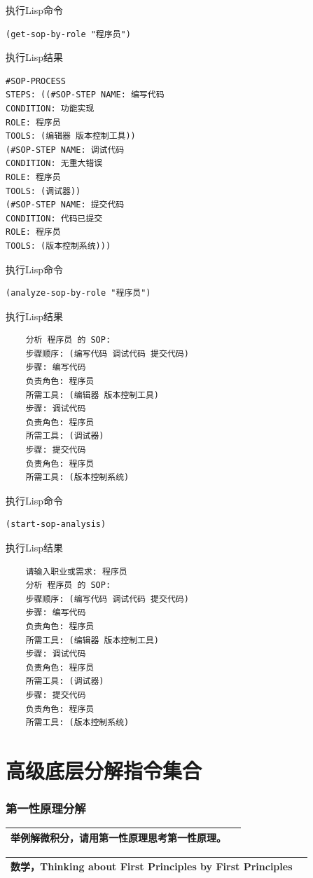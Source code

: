 \documentclass[12pt]{book}
\begin{document}
	执行Lisp命令
\begin{lstlisting}
(get-sop-by-role "程序员")
\end{lstlisting}

	执行Lisp结果
\begin{lstlisting}
#SOP-PROCESS
STEPS: ((#SOP-STEP NAME: 编写代码
CONDITION: 功能实现
ROLE: 程序员
TOOLS: (编辑器 版本控制工具))
(#SOP-STEP NAME: 调试代码
CONDITION: 无重大错误
ROLE: 程序员
TOOLS: (调试器))
(#SOP-STEP NAME: 提交代码
CONDITION: 代码已提交
ROLE: 程序员
TOOLS: (版本控制系统)))
\end{lstlisting}


	执行Lisp命令
\begin{lstlisting}
(analyze-sop-by-role "程序员")
\end{lstlisting}

	执行Lisp结果
\begin{lstlisting}
	分析 程序员 的 SOP:
	步骤顺序: (编写代码 调试代码 提交代码)
	步骤: 编写代码
	负责角色: 程序员
	所需工具: (编辑器 版本控制工具)
	步骤: 调试代码
	负责角色: 程序员
	所需工具: (调试器)
	步骤: 提交代码
	负责角色: 程序员
	所需工具: (版本控制系统)
\end{lstlisting}


	执行Lisp命令
\begin{lstlisting}
(start-sop-analysis)
\end{lstlisting}

执行Lisp结果
\begin{lstlisting}
	请输入职业或需求: 程序员
	分析 程序员 的 SOP:
	步骤顺序: (编写代码 调试代码 提交代码)
	步骤: 编写代码
	负责角色: 程序员
	所需工具: (编辑器 版本控制工具)
	步骤: 调试代码
	负责角色: 程序员
	所需工具: (调试器)
	步骤: 提交代码
	负责角色: 程序员
	所需工具: (版本控制系统)
\end{lstlisting}

\chapter{高级底层分解指令集合}
\subsection{第一性原理分解}

\begin{tabular}{|p{15cm}|p{3cm}|}
	\hline
举例解微积分，请用第一性原理思考第一性原理。\\
	\hline
\end{tabular}


\begin{tabular}{|p{15cm}|p{3cm}|}
	\hline
	数学，Thinking about First Principles by First Principles\\
	\hline
\end{tabular}
\end{document}
